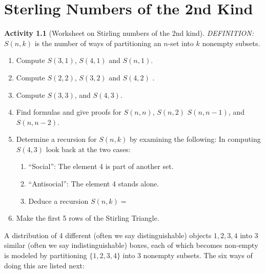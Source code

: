 \documentclass[10pt,]{book}
\theoremstyle{plain}
\theoremstyle{definition}
\newtheorem{activity}[project]{Activity}
\theoremstyle{definition}
\numberwithin{equation}{chapter}
\begin{document}
\chapter[{Sterling Numbers of the 2nd Kind}]{Sterling Numbers of the 2nd Kind}\label{ch_temp}
\begin{activity}[Worksheet on Stirling numbers of the 2nd kind]\label{activity-1}
\hypertarget{p-98}{}%
\emph{DEFINITION:} \(S\left( n,k \right)\) is the number of ways of partitioning an \(n\)-set into \(k\) nonempty subsets.%
\begin{enumerate}[font=\bfseries,label=(\alph*),ref=\alph*]
\item\label{task-1} \hypertarget{p-99}{}%
Compute \(S(3,1)\), \(S(4,1)\) and \(S(n,1)\).%
\item\label{task-2} \hypertarget{p-100}{}%
Compute \(S(2,2)\), \(S(3,2)\) and \(S(4,2)\) .%
\item\label{task-3} \hypertarget{p-101}{}%
Compute \(S(3,3)\), and \(S(4,3)\).%
\item\label{task-4} \hypertarget{p-102}{}%
Find formulas and give proofs for \(S(n,n)\), \(S(n,2)\) \(S(n,n - 1)\), and \(S(n,n-2)\).%
\item\label{task-5} \hypertarget{p-103}{}%
Determine a recursion for \(S(n,k)\) by examining the following: In computing \(S\left( 4,3 \right)\) look back at the two cases: \leavevmode%
\begin{enumerate}
\item\hypertarget{li-15}{}\hypertarget{p-104}{}%
``Social'': The element 4 is part of another set.%
\item\hypertarget{li-16}{}\hypertarget{p-105}{}%
``Antisocial'': The element 4 stands alone.%
\item\hypertarget{li-17}{}\hypertarget{p-106}{}%
Deduce a recursion \(S\left( n,k \right) =\)%
\end{enumerate}
%
\item\label{task-6} \hypertarget{p-107}{}%
Make the first 5 rows of the Stirling Triangle.%
\end{enumerate}
\end{activity}
\hypertarget{p-108}{}%
A distribution of 4 different (often we say distinguishable) objects \(1,2,3,4\) into 3 similar (often we say indistinguishable) boxes, each of which becomes non-empty is modeled by partitioning \(\{ 1,2,3,4\}\) into 3 nonempty subsets. The six ways of doing this are listed next:%
\end{document}
